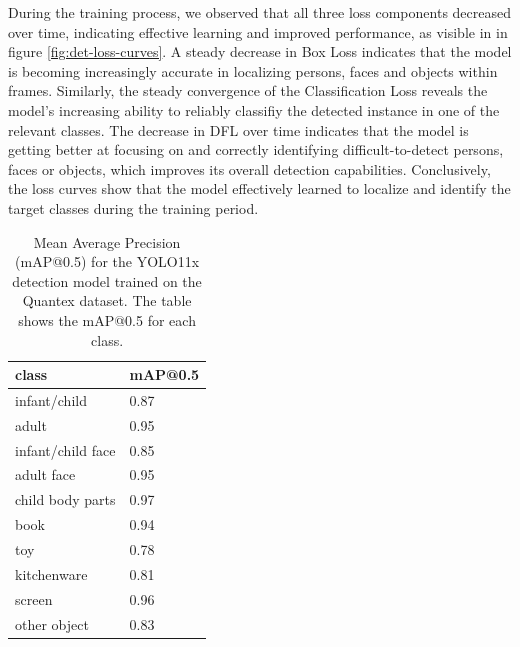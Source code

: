\documentclass[
  man,floatsintext]{apa6}
\begin{document}
During the training process, we observed that all three loss components decreased over time, indicating effective learning and improved performance, as visible in in figure \ref{fig:det-loss-curves}. A steady decrease in Box Loss indicates that the model is becoming increasingly accurate in localizing persons, faces and objects within frames. Similarly, the steady convergence of the Classification Loss reveals the model's increasing ability to reliably classifiy the detected instance in one of the relevant classes. The decrease in DFL over time indicates that the model is getting better at focusing on and correctly identifying difficult-to-detect persons, faces or objects, which improves its overall detection capabilities. Conclusively, the loss curves show that the model effectively learned to localize and identify the target classes during the training period.

\begin{table}[tbp]

\begin{center}
\begin{threeparttable}

\caption{\label{tab:det-map_all}Mean Average Precision (mAP@0.5) for the YOLO11x detection model trained on the Quantex dataset. The table shows the mAP@0.5 for each class.}

\begin{tabular}{ll}
\toprule
class & \multicolumn{1}{c}{mAP@0.5}\\
\midrule
infant/child & 0.87\\
adult & 0.95\\
infant/child face & 0.85\\
adult face & 0.95\\
child body parts & 0.97\\
book & 0.94\\
toy & 0.78\\
kitchenware & 0.81\\
screen & 0.96\\
other object & 0.83\\
\bottomrule
\end{tabular}

\end{threeparttable}
\end{center}

\end{table}
\end{document}

